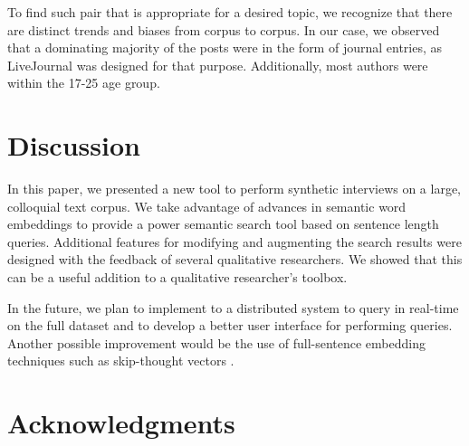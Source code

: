 \documentclass{sigchi}
\begin{document}
To find such pair that is appropriate for a desired topic, we recognize that there are distinct trends and biases from corpus to corpus. In our case, we observed that a dominating majority of the posts were in the form of journal entries, as LiveJournal was designed for that purpose. Additionally, most authors were within the 17-25 age group.

%


\section{Discussion}

In this paper, we presented a new tool to perform synthetic interviews on a large, colloquial text corpus. We take advantage of advances in semantic word embeddings to provide a power semantic search tool based on sentence length queries. Additional features for modifying and augmenting the search results were designed with the feedback of several qualitative researchers. We showed that this can be a useful addition to a qualitative researcher's toolbox. 

In the future, we plan to implement to a distributed system to query in real-time on the full dataset and to develop a better user interface for performing queries. Another possible improvement would be the use of full-sentence embedding techniques such as skip-thought vectors \cite{kiros2015skip}.

\section{Acknowledgments}




\end{document}
